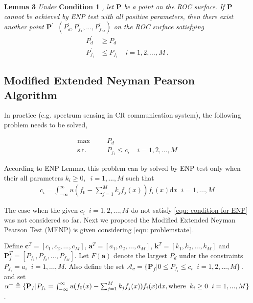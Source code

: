 \documentclass[12pt,journal,a4paper,twoside,doublecolumn]{IEEEtran}
\begin{document}
\begin{spacing}{1.0}
\noindent \textbf{Lemma 3}
\textit{
\noindent
Under}
\textbf{Condition 1}
\textit{, let $\mathbf{P}$ be a point on the ROC surface. If  $\mathbf{P}$ cannot be achieved by ENP test with all positive parameters, then there  exist another point $\mathbf{P}^\prime\;\; (P_d^\prime, P_{f_1}^\prime, ..., P_{f_M}^\prime)$ on the ROC surface satisfying
}
\begin{equation}
  \label{equ: lemma 3 equation}
  \begin{split}
    P_d^\prime &\geq P_d\\
    P_{f_i}^\prime &\leq P_{f_i}\;\;\;\;i = 1, 2, ..., M\,.
  \end{split}
\end{equation}

\subsection{Modified Extended Neyman Pearson Algorithm}


In practice (e.g. spectrum sensing in CR communication system), the following problem needs to be solved,

      \begin{equation}
      \label{equ: problemstate}
      \begin{split}
      \max\;\;\;\;\;\;&P_d\\
      \text{s.t.}\;\;\;\;\;\;&P_{f_i} \leq c_i\;\;\;\;i = 1, 2, ..., M
      \end{split}
      \end{equation}

According to ENP Lemma, this problem can by solved by ENP test only when their all parameters $k_i \geq 0, \;\;i=1, ..., M$ such that 
\begin{equation}
\label{equ: condition for ENP}
\begin{split}
c_i = \int_{-\infty}^{\infty}u(f_0 - \sum_{j=1}^{M}k_jf_j(x))f_i(x)\mathrm{d}x \;\;i = 1, ..., M
\end{split}
\end{equation}

The case when the given $c_i\;\;i = 1, 2, ..., M$ do not satisfy \eqref{equ: condition for ENP} was not considered so far. Next we proposed the Modified Extended Neyman Pearson Test (MENP) is given considering \eqref{equ: problemstate}.

\def \JUDGEMENT{u(f_0(x) - \sum_{j=1}^{M}k_j f_j(x))}

Define $\mathbf{c}^T = [c_1, c_2, ..., c_M]$, $\mathbf{a}^T=[a_1, a_2, ..., a_M]$, $\mathbf{k}^T = [k_1, k_2, ..., k_M]$ and  $\mathbf{P}_f^T = [P_{f_1}, P_{f_2}, ..., P_{f_M}]$. Let
$F(\mathbf{a})$ denote the largest $P_d$ under the constraints $P_{f_i} = a_i\;\;i = 1, ..., M$.
Also define the set $\mathcal{A}_\mathbf{c} = \{
  \mathbf{P}_f | 0 \leq P_{f_i} \leq c_i
  \;\;i=1, 2, ..., M\}\,.
$ and set $\alpha^+ \triangleq \{\mathbf{P}_f | P_{f_i} = \int_{-\infty}^{\infty} \JUDGEMENT f_i(x) \mathrm{d}x, \text{where\;\;} k_i \geq 0 \;\;i=1, ..., M\}$.


\end{spacing}
\end{document}
